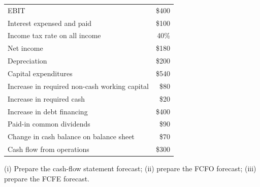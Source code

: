 \begin{exbox}
\begin{center}
\begin{tabular}{@{}lr@{}}
EBIT & \$400\\
Interest expensed and paid & \$100\\
Income tax rate on all income & 40\%\\
Net income & \$180\\
Depreciation & \$200\\
Capital expenditures & \$540\\
Increase in required non-cash working capital & \$80\\
Increase in required cash & \$20\\
Increase in debt financing & \$400\\
Paid-in common dividends & \$90\\
Change in cash balance on balance sheet & \$70\\
Cash flow from operations & \$300\\
\end{tabular}
\end{center}
(i) Prepare the cash-flow statement forecast; (ii) prepare the FCFO forecast; (iii) prepare the FCFE forecast.
\end{exbox}

